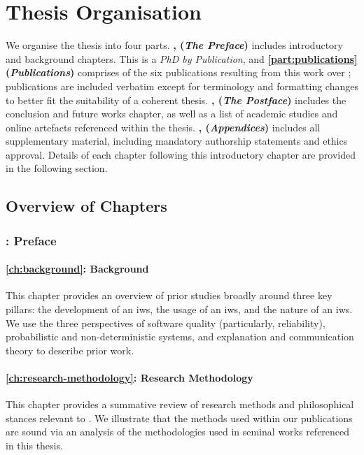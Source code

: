 \section{Thesis Organisation}
\label{sec:introduction:organisation}

We organise the thesis into four parts. \textbf{, (\textit{The Preface})} includes introductory and background chapters. This is a \textit{PhD by Publication}, and \textbf{\cref{part:publications} (\textit{Publications})} comprises of the six publications resulting from this work over ; publications are included verbatim except for terminology and formatting changes to better fit the suitability of a coherent thesis. \textbf{, (\textit{The Postface})} includes the conclusion and future works chapter, as well as a list of academic studies and online artefacts referenced within the thesis. \textbf{, (\textit{Appendices})} includes all supplementary material, including mandatory authorship statements and ethics approval. Details of each chapter following this introductory chapter are provided in the following section.

\subsection{Overview of Chapters}

\subsubsection{: Preface}


\paragraph{\cref{ch:background}: Background} This chapter provides an overview of prior studies broadly around three key pillars: the development of an \gls{iws}, the usage of an \gls{iws}, and the nature of an \gls{iws}. We use the three perspectives of software quality (particularly, reliability), probabilistic and non-deterministic systems, and explanation and communication theory to describe prior work.

\paragraph{\cref{ch:research-methodology}: Research Methodology} This chapter provides a summative review of research methods and philosophical stances relevant to . We illustrate that the methods used within our publications are sound via an analysis of the methodologies used in seminal works referenced in this thesis.

